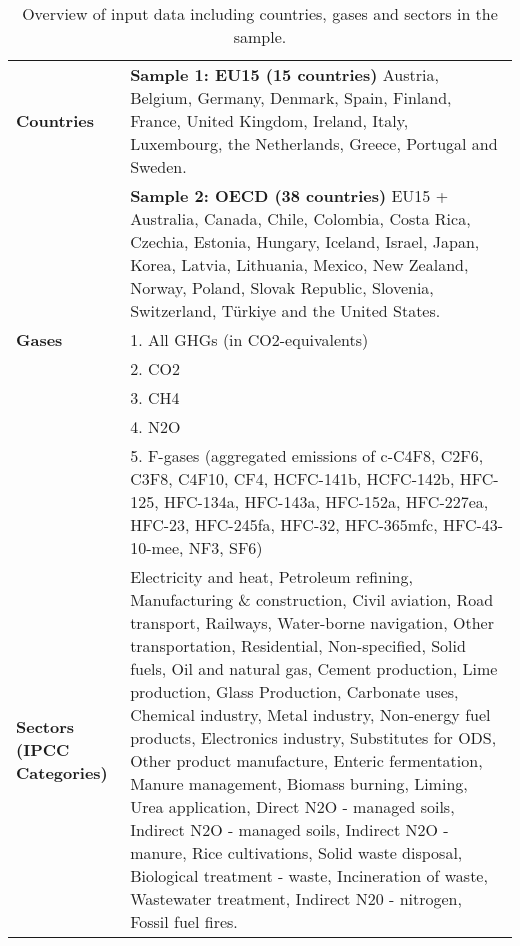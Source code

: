 \documentclass[a4paper]{article}
\begin{document}

\begin{table}
    \centering
    \caption{Overview of input data including countries, gases and sectors in the sample.}
    \renewcommand{\arraystretch}{1.5}
    \begin{adjustbox}{center}
    \begin{tabular}{p{2.5cm} p{14cm}}
    \hline
        \textbf{Countries} & \textbf{Sample 1: EU15 (15 countries)}
                    Austria, Belgium, Germany, Denmark, Spain, Finland, France, United Kingdom, Ireland, Italy, Luxembourg, the Netherlands, Greece, Portugal and Sweden. \\
                  & \textbf{Sample 2: OECD (38 countries)}
                    EU15 + Australia, Canada, Chile, Colombia, Costa Rica, Czechia, Estonia, Hungary, Iceland, Israel, Japan, Korea, Latvia, Lithuania, Mexico, New Zealand, Norway, Poland, Slovak Republic, Slovenia, Switzerland, Türkiye and the United States. \\ \hline
         \textbf{Gases}    & 1. All GHGs (in CO2-equivalents) \\
                  & 2. CO2 \\
                  & 3. CH4 \\
                  & 4. N2O \\
                  & 5. F-gases (aggregated emissions of c-C4F8, C2F6, C3F8, C4F10, CF4, HCFC-141b, HCFC-142b, HFC-125, HFC-134a, HFC-143a, HFC-152a, HFC-227ea, HFC-23, HFC-245fa, HFC-32, HFC-365mfc, HFC-43-10-mee, NF3, SF6) \\ \hline
         \textbf{Sectors (IPCC Categories)} & Electricity and heat, Petroleum refining, Manufacturing \& construction, Civil aviation, Road transport, Railways, Water-borne navigation, Other transportation, Residential, Non-specified, Solid fuels, Oil and natural gas, Cement production, Lime production, Glass Production, Carbonate uses, Chemical industry, Metal industry, Non-energy fuel products, Electronics industry, Substitutes for ODS, Other product manufacture, Enteric fermentation, Manure management, Biomass burning, Liming, Urea application, Direct N2O - managed soils, Indirect N2O  - managed soils, Indirect N2O - manure, Rice cultivations, Solid waste disposal, Biological treatment - waste, Incineration of waste, Wastewater treatment, Indirect N20 - nitrogen, Fossil fuel fires. \\ \hline
    \end{tabular}
    \label{tab:data_inputs}
    \end{adjustbox}
\end{table}
\end{document}
